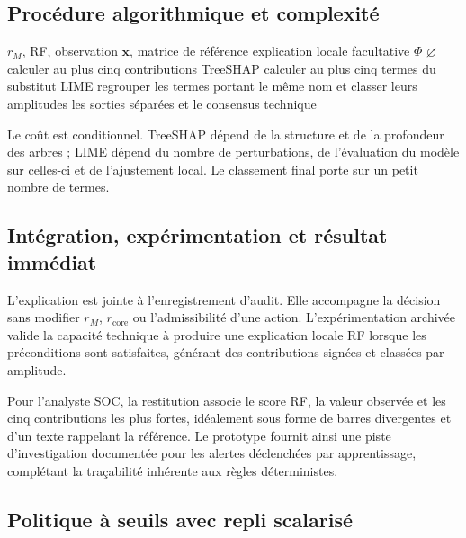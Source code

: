 \documentclass[11pt,a4paper,oneside]{report}
\theoremstyle{definition}
\theoremstyle{plain}
\begin{document}
\subsection*{Procédure algorithmique et complexité}

\begin{algorithm}[H]
\caption{Explication RF conditionnelle}
\label{alg:ai-ro-xai}
\begin{algorithmic}[1]
\Require $r_M$, RF, observation $\mathbf{x}$, matrice de référence
\Ensure explication locale facultative $\Phi$
  \State \Return $\varnothing$
\EndIf
\State calculer au plus cinq contributions TreeSHAP
\State calculer au plus cinq termes du substitut LIME
\State regrouper les termes portant le même nom et classer leurs amplitudes
\State \Return les sorties séparées et le consensus technique
\end{algorithmic}
\end{algorithm}

Le coût est conditionnel. TreeSHAP dépend de la structure et de la profondeur
des arbres ; LIME dépend du nombre de perturbations, de l'évaluation du modèle
sur celles-ci et de l'ajustement local. Le classement final porte sur un petit
nombre de termes.

\subsection*{Intégration, expérimentation et résultat immédiat}

L'explication est jointe à l'enregistrement d'audit. Elle accompagne la décision
sans modifier $r_M$, $r_{\mathrm{core}}$ ou l'admissibilité d'une action.
L'expérimentation archivée valide la capacité technique à produire une
explication locale RF lorsque les préconditions sont satisfaites, générant des
contributions signées et classées par amplitude.

Pour l'analyste SOC, la restitution associe le score RF, la valeur observée et
les cinq contributions les plus fortes, idéalement sous forme de barres divergentes
et d'un texte rappelant la référence. Le prototype fournit ainsi une piste
d'investigation documentée pour les alertes déclenchées par apprentissage, complétant
la traçabilité inhérente aux règles déterministes.

\subsection{Politique à seuils avec repli scalarisé}
\label{sec:ai-ro-response}
\end{document}
